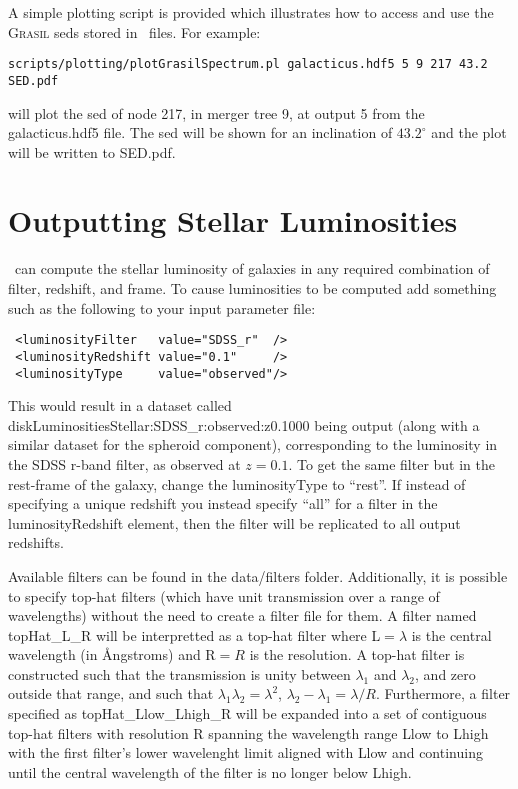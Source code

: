 A simple plotting script is provided which illustrates how to access and use the {\normalfont \scshape Grasil} \glspl{sed} stored in \glc\ files. For example:
\begin{verbatim}
scripts/plotting/plotGrasilSpectrum.pl galacticus.hdf5 5 9 217 43.2 SED.pdf
\end{verbatim}
will plot the \gls{sed} of node 217, in merger tree 9, at output 5 from the {\normalfont \ttfamily galacticus.hdf5} file. The \gls{sed} will be shown for an inclination of $43.2^\circ$ and the plot will be written to {\normalfont \ttfamily SED.pdf}.

\section{Outputting Stellar Luminosities}

\glc\ can compute the stellar luminosity of galaxies in any required combination of filter, redshift, and frame. To cause luminosities to be computed add something such as the following to your input parameter file:
\begin{verbatim}
 <luminosityFilter   value="SDSS_r"  />
 <luminosityRedshift value="0.1"     />
 <luminosityType     value="observed"/>
\end{verbatim}
This would result in a dataset called {\normalfont \ttfamily diskLuminositiesStellar:SDSS\_r:observed:z0.1000} being output (along with a similar dataset for the spheroid component), corresponding to the luminosity in the SDSS r-band filter, as observed at $z=0.1$. To get the same filter but in the rest-frame of the galaxy, change the {\normalfont \ttfamily luminosityType} to ``{\normalfont \ttfamily rest}''. If instead of specifying a unique redshift you instead specify ``{\normalfont \ttfamily all}'' for a filter in the {\normalfont \ttfamily luminosityRedshift} element, then the filter will be replicated to all output redshifts.

Available filters can be found in the {\normalfont \ttfamily data/filters} folder. Additionally, it is possible to specify top-hat filters (which have unit transmission over a range of wavelengths) without the need to create a filter file for them. A filter named {\normalfont \ttfamily topHat\_L\_R} will be interpretted as a top-hat filter where {\normalfont \ttfamily L}$=\lambda$ is the central wavelength (in \AA ngstroms) and {\normalfont \ttfamily R}$=R$ is the resolution. A top-hat filter is constructed such that the transmission is unity between $\lambda_1$ and $\lambda_2$, and zero outside that range, and such that $\lambda_1\lambda_2=\lambda^2$, $\lambda_2-\lambda_1=\lambda/R$. Furthermore, a filter specified as {\normalfont \ttfamily topHat\_Llow\_Lhigh\_R} will be expanded into a set of contiguous top-hat filters with resolution {\normalfont \ttfamily R} spanning the wavelength range {\normalfont \ttfamily Llow} to {\normalfont \ttfamily Lhigh} with the first filter's lower wavelenght limit aligned with {\normalfont \ttfamily Llow} and continuing until the central wavelength of the filter is no longer below {\normalfont \ttfamily Lhigh}.

